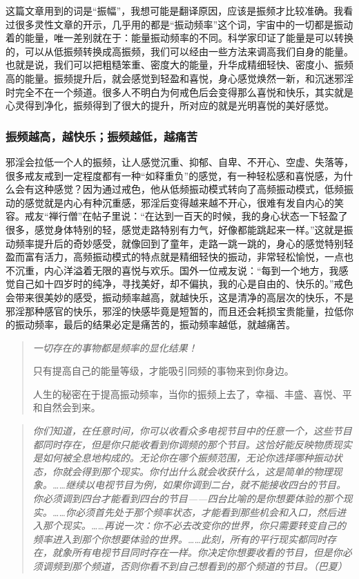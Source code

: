 这篇文章用到的词是“振幅”，我想可能是翻译原因，应该是振频才比较准确。我看过很多灵性文章的开示，几乎用的都是“振动频率”这个词，宇宙中的一切都是振动着的能量，唯一差别就在于：能量振动频率的不同。科学家印证了能量是可以转换的，可以从低振频转换成高振频，我们可以经由一些方法来调高我们自身的能量。也就是说，我们可以把粗糙笨重、密度大的能量，升华成精细轻快、密度小、振频高的能量。振频提升后，就会感觉到轻盈和喜悦，身心感觉焕然一新，和沉迷邪淫时完全不在一个频道。很多人不明白为何戒色后会变得那么喜悦和快乐，其实就是心灵得到净化，振频得到了很大的提升，所对应的就是光明喜悦的美好感觉。

\subsubsection{振频越高，越快乐；振频越低，越痛苦}

邪淫会拉低一个人的振频，让人感觉沉重、抑郁、自卑、不开心、空虚、失落等，很多戒友戒到一定程度都有一种“如释重负”的感觉，有一种轻松感和喜悦感，为什么会有这种感觉？因为通过戒色，他从低频振动模式转向了高频振动模式，低频振动的感觉就是内心有种沉重感，邪淫后变得越来越不开心，很难有发自内心的笑容。戒友“禅行僧”在帖子里说：“在达到一百天的时候，我的身心状态一下轻盈了很多，感觉身体特别的轻，感觉走路特别有力气，好像都能跳起来一样。”这就是振动频率提升后的奇妙感受，就像回到了童年，走路一跳一跳的，身心的感觉特别轻盈而富有活力，高频振动模式的特点就是精细轻快的振动，非常轻松愉悦，一点也不沉重，内心洋溢着无限的喜悦与欢乐。国外一位戒友说：“每到一个地方，我感觉自己如十四岁时的纯净，寻找美好，却不偏执，我的心是自由的、快乐的。”戒色会带来很美妙的感受，振动频率越高，就越快乐，这是清净的高层次的快乐，不是邪淫那种感官的快乐，邪淫的快感毕竟是短暂的，而且还会耗损宝贵能量，拉低你的振动频率，最后的结果必定是痛苦的，振动频率越低，就越痛苦。

\begin{quotation}\it
    一切存在的事物都是频率的显化结果！

    只有提高自己的能量等级，才能吸引同频的事物来到你身边。

    人生的秘密在于提高振动频率，当你的振频上去了，幸福、丰盛、喜悦、平和自然会到来。
\end{quotation}

\begin{quote}\it
    你们知道，在任意时间，你可以收看众多电视节目中的任意一个，这些节目都同时存在，但是你只能收看到你调频的那个节目。这恰好能反映物质现实是如何被全息地构成的。无论你在哪个振频范围，无论你选择哪种振动状态，你就会得到那个现实。你付出什么就会收获什么，这是简单的物理现象。……继续以电视节目为例，如果你调到二台，就不能接收四台的节目。你必须调到四台才能看到四台的节目——四台比喻的是你想要体验的那个现实。……你必须首先处于那个频率状态，才能看到那些机会和入口，然后进入那个现实。……再说一次：你不必去改变你的世界，你只需要转变自己的频率进入到那个你想要体验的世界。……此刻，所有的平行现实都同时存在，就象所有电视节目同时存在一样。你决定你想要收看的节目，但是你必须调频到那个频道，否则你看不到自己想看到的那个频道的节目。（巴夏）
\end{quote}

